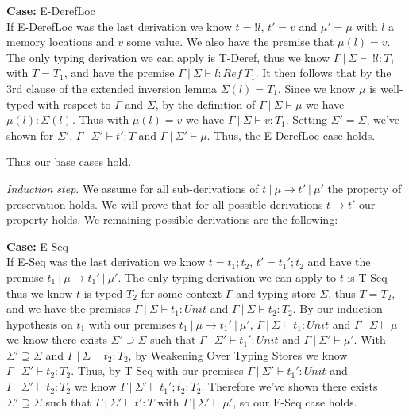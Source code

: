 \documentclass[12pt, fleqn]{article}
\begin{document}
\medskip
\textbf{Case:} E-DerefLoc\\
If E-DerefLoc was the last derivation we know $t = !l$, $t' = v$ and $\mu' = \mu$ with $l$ a memory locations and $v$ some value. We also have the premise that $\mu(l) = v$. The only typing derivation we can apply is T-Deref, thus we know $\Gamma\:|\:\Sigma \vdash\: !l : T_1$ with $T = T_1$, and have the premise $\Gamma\:|\:\Sigma \vdash l : Ref\:T_1$. It then follows that by the 3rd clause of the extended inversion lemma $\Sigma(l) = T_1$. 
Since we know $\mu$ is well-typed with respect to $\Gamma$ and $\Sigma$, by the definition of $\Gamma\:|\:\Sigma \vdash \mu$ we have $\mu(l) : \Sigma(l)$. Thus with $\mu(l) = v$ we have $\Gamma\:|\:\Sigma \vdash v : T_1$. Setting $\Sigma' = \Sigma$, we've shown for $\Sigma'$, $\Gamma\:|\:\Sigma' \vdash t' : T$ and $\Gamma\:|\:\Sigma' \vdash \mu$. Thus, the E-DerefLoc case holds.

\medskip
Thus our base cases hold.

\medskip
\emph{Induction step}. We assume for all sub-derivations of $t\:|\:\mu \rightarrow t'\:|\:\mu'$ the property of preservation holds. We will prove that for all possible derivations $t \rightarrow t'$ our property holds. We remaining possible derivations are the following:

\medskip
\textbf{Case:} E-Seq\\
If E-Seq was the last derivation we know $t = t_1 ; t_2$, $t' = t_1' ; t_2$ and have the premise $t_1\:|\:\mu \rightarrow t_1'\:|\:\mu'$. The only typing derivation we can apply to $t$ is T-Seq thus we know $t$ is typed $T_2$ for some context $\Gamma$ and typing store $\Sigma$, thus $T = T_2$, and we have the premises $\Gamma\:|\: \Sigma \vdash t_1 : Unit$ and $\Gamma\:|\:\Sigma \vdash t_2 : T_2$. 
By our induction hypothesis on $t_1$ with our premises $t_1\:|\:\mu \rightarrow t_1'\:|\:\mu'$, $\Gamma\:|\: \Sigma \vdash t_1 : Unit$ and $\Gamma\:|\:\Sigma \vdash \mu$ we know there exists $\Sigma' \supseteq \Sigma$ such that $\Gamma\:|\:\Sigma' \vdash t_1' : Unit$ and $\Gamma\:|\:\Sigma' \vdash \mu'$. With $\Sigma' \supseteq \Sigma$ and $\Gamma\:|\:\Sigma \vdash t_2 : T_2$, by Weakening Over Typing Stores we know $\Gamma\:|\:\Sigma' \vdash t_2 : T_2$. Thus, by T-Seq with our premises $\Gamma\:|\:\Sigma' \vdash t_1' : Unit$ and $\Gamma\:|\:\Sigma' \vdash t_2 : T_2$ we know $\Gamma\:|\:\Sigma' \vdash t_1' ; t_2 : T_2$. Therefore we've shown there exists $\Sigma' \supseteq \Sigma$ such that $\Gamma\:|\:\Sigma' \vdash t' : T$ with $\Gamma\:|\:\Sigma' \vdash \mu'$, so our E-Seq case holds.
\end{document}
